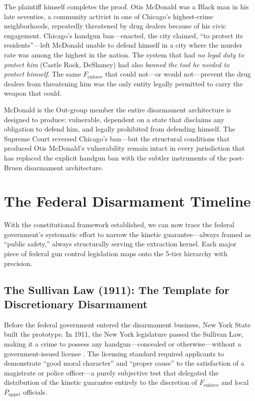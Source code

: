 \documentclass[12pt,openany]{book}
\begin{document}
The plaintiff himself completes the proof. Otis McDonald was a Black man in his late seventies, a community activist in one of Chicago's highest-crime neighborhoods, repeatedly threatened by drug dealers because of his civic engagement. Chicago's handgun ban---enacted, the city claimed, ``to protect its residents''---left McDonald unable to defend himself in a city where the murder rate was among the highest in the nation. The system that had \textit{no legal duty to protect him} (Castle Rock, DeShaney) had also \textit{banned the tool he needed to protect himself}. The same $F_{\text{enforce}}$ that could not---or would not---prevent the drug dealers from threatening him was the only entity legally permitted to carry the weapon that could.

McDonald is the Out-group member the entire disarmament architecture is designed to produce: vulnerable, dependent on a state that disclaims any obligation to defend him, and legally prohibited from defending himself. The Supreme Court reversed Chicago's ban---but the structural conditions that produced Otis McDonald's vulnerability remain intact in every jurisdiction that has replaced the explicit handgun ban with the subtler instruments of the post-Bruen disarmament architecture.

\section{The Federal Disarmament Timeline}

With the constitutional framework established, we can now trace the federal government's systematic effort to narrow the kinetic guarantee---always framed as ``public safety,'' always structurally serving the extraction kernel. Each major piece of federal gun control legislation maps onto the 5-tier hierarchy with precision.

\subsection{The Sullivan Law (1911): The Template for Discretionary Disarmament}

Before the federal government entered the disarmament business, New York State built the prototype. In 1911, the New York legislature passed the Sullivan Law, making it a crime to possess any handgun---concealed or otherwise---without a government-issued license \cite{sullivanlaw}. The licensing standard required applicants to demonstrate ``good moral character'' and ``proper cause'' to the satisfaction of a magistrate or police officer---a purely subjective test that delegated the distribution of the kinetic guarantee entirely to the discretion of $F_{\text{enforce}}$ and local $P_{\text{uppet}}$ officials.
\end{document}
